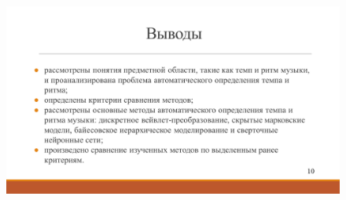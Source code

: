 \begin{figure}[h!]
	\begin{center}
		\includegraphics[angle=90,scale=0.75]{slides/Slide10.png}
	\end{center}
\end{figure}
